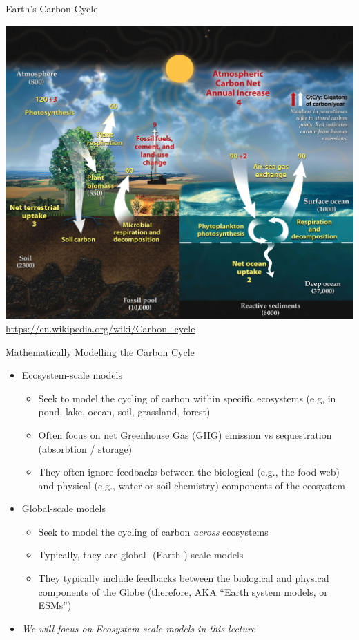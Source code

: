 \documentclass[xcolor={usenames,x11names},compress]{beamer}
\renewcommand{\(}{\begin{columns}}
\renewcommand{\)}{\end{columns}}
\newcommand{\<}[1]{\begin{column}{#1}}
\renewcommand{\>}{\end{column}}
\begin{document}
\begin{frame}{Earth's Carbon Cycle}

  \centering
  \includegraphics[width=.7\textwidth]{graphics/Carbon_cycle.jpg}\\
\vspace{-8pt}
{\tiny \url{https://en.wikipedia.org/wiki/Carbon_cycle}}
\end{frame}

\begin{frame}{Mathematically Modelling the Carbon Cycle}

\begin{itemize}[<+->]\itemsep10pt
  \item Ecosystem-scale models 
    \begin{itemize}
      \item Seek to model the cycling of carbon within specific ecosystems (e.g, in pond, lake, ocean, soil, grassland, forest) 
      \item Often focus on net Greenhouse Gas (GHG) emission vs sequestration (absorbtion / storage)
      \item They often ignore feedbacks between the biological (e.g., the food web) and physical (e.g., water or soil chemistry) components of the ecosystem
    \end{itemize}
    \item Global-scale models
    \begin{itemize}
      \item Seek to model the cycling of carbon {\it across} ecosystems 
      \item Typically, they are global- (Earth-) scale models 
      \item They typically include feedbacks between the biological and physical components of the Globe (therefore, AKA ``Earth system models, or ESMs'') 
    \end{itemize}
    \item \it We will focus on Ecosystem-scale models in this lecture
\end{itemize}

\end{frame}
\end{document}
